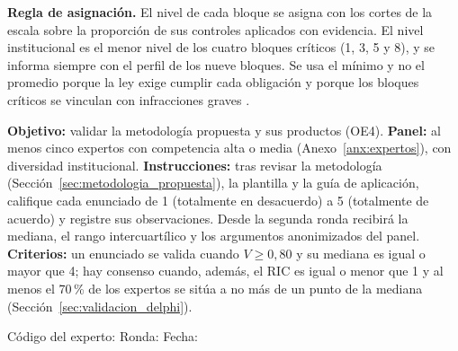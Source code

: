\textbf{Regla de asignación.} El nivel de cada bloque se asigna con los cortes de la escala sobre la proporción de sus controles aplicados con evidencia. El nivel institucional es el menor nivel de los cuatro bloques críticos (1, 3, 5 y 8), y se informa siempre con el perfil de los nueve bloques. Se usa el mínimo y no el promedio porque la ley exige cumplir cada obligación y porque los bloques críticos se vinculan con infracciones graves \cite[art.~68]{lopdp2021}.

\label{anx:validacion}

\textbf{Objetivo:} validar la metodología propuesta y sus productos (OE4). \textbf{Panel:} al menos cinco expertos con competencia alta o media (Anexo~\ref{anx:expertos}), con diversidad institucional. \textbf{Instrucciones:} tras revisar la metodología (Sección~\ref{sec:metodologia_propuesta}), la plantilla y la guía de aplicación, califique cada enunciado de 1 (totalmente en desacuerdo) a 5 (totalmente de acuerdo) y registre sus observaciones. Desde la segunda ronda recibirá la mediana, el rango intercuartílico y los argumentos anonimizados del panel. \textbf{Criterios:} un enunciado se valida cuando $V \geq 0{,}80$ y su mediana es igual o mayor que 4; hay consenso cuando, además, el RIC es igual o menor que 1 y al menos el 70\,\% de los expertos se sitúa a no más de un punto de la mediana (Sección~\ref{sec:validacion_delphi}).

\vspace{6pt}
\noindent Código del experto: \linea{2cm} \quad Ronda: \linea{1.5cm} \quad Fecha: \linea{3cm}

